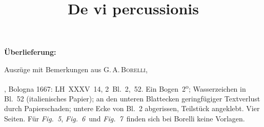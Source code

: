 %  
%				
%				
%
%
%
\frenchspacing
%
\begin{ledgroupsized}[r]{120mm}
\footnotesize
\pstart
\noindent\textbf{Überlieferung:}
\pend
\end{ledgroupsized}
%
\begin{ledgroupsized}[r]{114mm}
\footnotesize
\pstart \parindent -6mm
%
Auszüge mit Bemerkungen aus 
\protect{}\textsc{G.\,A.\,Borelli}, 
\cite{01001}\title{De vi percussionis}, Bologna 1667: 
LH~XXXV~14, 2~Bl.~2,~52. 
Ein Bogen~2\textsuperscript{o};
Wasserzeichen in Bl.~52 (italienisches Papier);
an den unteren Blattecken  geringfügiger Textverlust durch Papierschaden; 
untere Ecke von Bl.~2 abgerissen, Teilstück angeklebt.
Vier Seiten.
Für \lbrack\textit{Fig.~5}\rbrack, \lbrack\textit{Fig.~6}\rbrack\ und  \lbrack\textit{Fig.~7}\rbrack\ finden sich bei Borelli keine Vorlagen.
\pend
\end{ledgroupsized}
%
%
\vspace{5mm}
